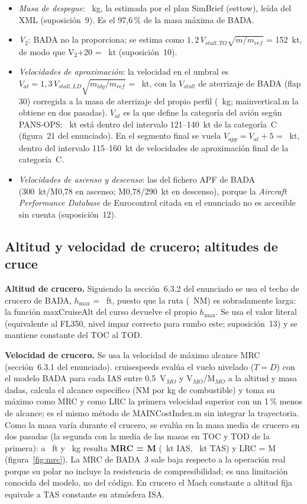 \documentclass[11pt,a4paper]{article}
\DeclareRobustCommand{\m}[1]{{\ttfamily\def\_{\textunderscore\penalty100\relax}#1}}
\begin{document}
\begin{itemize}
\item \emph{Masa de despegue}: \sbTOW~kg, la estimada por el plan SimBrief (\m{est\_tow}), leída del XML (suposición~9). Es el 97,6\,\% de la masa máxima de BADA.
\item \emph{V$_2$}: BADA no la proporciona; se estima como $1{,}2\,V_{stall,TO}\sqrt{m/m_{ref}}$ = 152~kt, de modo que V$_2$+20 = \vVIIpIIO~kt (suposición~10).
\item \emph{Velocidades de aproximación}: la velocidad en el umbral es $V_{at} = 1{,}3\,V_{stall,LD}\sqrt{m_{ldg}/m_{ref}}$ = \vVref~kt, con la $V_{stall}$ de aterrizaje de BADA (flap 30) corregida a la masa de aterrizaje del propio perfil (\vMldg~kg; \m{main\_vertical.m} la obtiene en dos pasadas). $V_{at}$ es la que define la categoría del avión según PANS-OPS: \vVref~kt está dentro del intervalo 121--140~kt de la categoría~C (figura~21 del enunciado). En el segmento final se vuela $V_{app} = V_{at}+5$ = \vVfap~kt, dentro del intervalo 115--160~kt de velocidades de aproximación final de la categoría~C.
\item \emph{Velocidades de ascenso y descenso}: las del fichero APF de BADA (300~kt/M0,78 en ascenso; M0,78/290~kt en descenso), porque la \emph{Aircraft Performance Database} de Eurocontrol citada en el enunciado no es accesible sin cuenta (suposición~12).
\end{itemize}

\subsection{Altitud y velocidad de crucero; altitudes de cruce}

\textbf{Altitud de crucero.} Siguiendo la sección~6.3.2 del enunciado se usa el techo de crucero de BADA, $h_{\max}$ = \vHcru~ft, puesto que la ruta (\vTotalD~NM) es sobradamente larga: la función \m{maxCruiseAlt} del curso devuelve el propio $h_{\max}$. Se usa el valor literal (equivalente al FL350, nivel impar correcto para rumbo este; suposición~13) y se mantiene constante del TOC al TOD.

\textbf{Velocidad de crucero.} Se usa la velocidad de máximo alcance MRC (sección~6.3.1 del enunciado). \m{cruise\_speeds} evalúa el vuelo nivelado ($T=D$) con el modelo BADA para cada IAS entre 0,5~V$_{MO}$ y V$_{MO}$/M$_{MO}$ a la altitud y masa dadas, calcula el alcance específico (NM por kg de combustible) y toma su máximo como MRC y como LRC la primera velocidad superior con un 1\,\% menos de alcance; es el mismo método de \m{MAIN\_Cost\_Index.m} sin integrar la trayectoria. Como la masa varía durante el crucero, se evalúa en la masa media de crucero en dos pasadas (la segunda con la media de las masas en TOC y TOD de la primera): a \vHcru~ft y \vMcruMed~kg resulta \textbf{MRC = M\vMcru} (\vIAScru~kt IAS, \vTAScru~kt TAS) y LRC = M\cMachLRCI{} (figura~\ref{fig:mrc}). La MRC de BADA~3 sale baja respecto a la operación real porque su polar no incluye la resistencia de compresibilidad; es una limitación conocida del modelo, no del código. En crucero el Mach constante a altitud fija equivale a TAS constante en atmósfera ISA.
\end{document}
